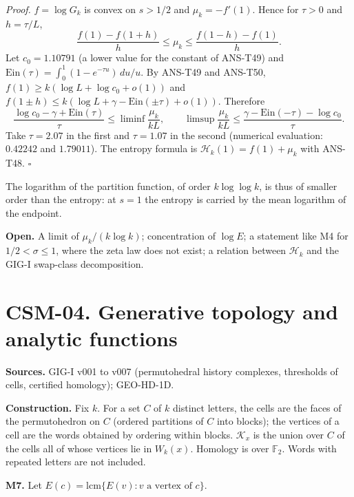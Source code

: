 \documentclass[
  11pt,
]{article}
\begin{document}
\emph{Proof.} \(f=\log G_k\) is convex on \(s>1/2\) and
\(\mu_k=-f'(1)\). Hence for \(\tau>0\) and \(h=\tau/L\),
\[\frac{f(1)-f(1+h)}h\le\mu_k\le\frac{f(1-h)-f(1)}h.\] Let
\(c_0=1.10791\) (a lower value for the constant of ANS-T49) and
\(\mathrm{Ein}(\tau)=\int_0^1(1-e^{-\tau u})\,du/u\). By ANS-T49 and
ANS-T50, \(f(1)\ge k(\log L+\log c_0+o(1))\) and
\(f(1\pm h)\le k(\log L+\gamma-\mathrm{Ein}(\pm\tau)+o(1))\). Therefore
\[\frac{\log c_0-\gamma+\mathrm{Ein}(\tau)}{\tau}\le\liminf\frac{\mu_k}{kL},\qquad\limsup\frac{\mu_k}{kL}\le\frac{\gamma-\mathrm{Ein}(-\tau)-\log c_0}{\tau}.\]
Take \(\tau=2.07\) in the first and \(\tau=1.07\) in the second
(numerical evaluation: \(0.42242\) and \(1.79011\)). The entropy formula
is \(\mathcal H_k(1)=f(1)+\mu_k\) with ANS-T48. \(\square\)

The logarithm of the partition function, of order \(k\log\log k\), is
thus of smaller order than the entropy: at \(s=1\) the entropy is
carried by the mean logarithm of the endpoint.

\textbf{Open.} A limit of \(\mu_k/(k\log k)\); concentration of
\(\log E\); a statement like M4 for \(1/2<\sigma\le1\), where the zeta
law does not exist; a relation between \(\mathcal H_k\) and the GIG-I
swap-class decomposition.

\hypertarget{csm-04.-generative-topology-and-analytic-functions}{%
\section{CSM-04. Generative topology and analytic
functions}\label{csm-04.-generative-topology-and-analytic-functions}}

\textbf{Sources.} GIG-I v001 to v007 (permutohedral history complexes,
thresholds of cells, certified homology); GEO-HD-1D.

\textbf{Construction.} Fix \(k\). For a set \(C\) of \(k\) distinct
letters, the cells are the faces of the permutohedron on \(C\) (ordered
partitions of \(C\) into blocks); the vertices of a cell are the words
obtained by ordering within blocks. \(\mathcal K_x\) is the union over
\(C\) of the cells all of whose vertices lie in \(W_k(x)\). Homology is
over \(\mathbb F_2\). Words with repeated letters are not included.

\textbf{M7.} Let \(E(c)=\mathrm{lcm}\{E(v):v\text{ a vertex of }c\}\).
\end{document}
